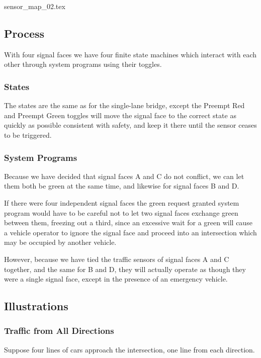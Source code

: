 \documentclass[letterpaper,twoside]{article}
\begin{document}
 {sensor_map_02.tex}

\subsection{Process}

With four signal faces we have four finite state machines which
interact with each other through system programs using their
toggles.

\subsubsection{States}

The states are the same as for the single-lane bridge,
except the Preempt Red and Preempt Green toggles will move the signal face
to the correct state as quickly as possible consistent with
safety, and keep it there until the sensor ceases to be triggered.

\subsubsection{System Programs}

Because we have decided that signal faces A and C do not conflict,
we can let them both be green at the same time, and likewise for
signal faces B and D.

If there were four independent signal faces the green request granted
system program would have to  be careful not to let two signal faces
exchange green between them, freezing out a third, since an excessive
wait for a green will cause a vehicle operator to ignore the signal face
and proceed into an intersection which may be occupied by another vehicle.

However, because we have tied the traffic sensors of signal faces A and C
together, and the same for B and D, they will actually operate
as though they were a single signal face, except in the presence
of an emergency vehicle.

\subsection{Illustrations}

\subsubsection{Traffic from All Directions}

Suppose four lines of cars approach the intersection, one
line from each direction.
\end{document}
